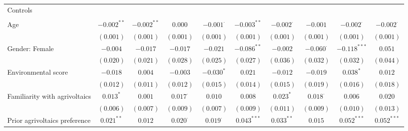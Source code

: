 \begin{center}
\begin{small}
\begin{longtable}{l@{} c@{} c@{} c@{} c@{} c@{} c@{} c@{} c@{} c@{}}
Controls                            &                  &                 &                 &                  &                  &                  &                  &                  &                  \\
                                    &                  &                 &                 &                  &                  &                  &                  &                  &                  \\
\quad Age                           & $-0.002^{**}$    & $-0.002^{**}$   & $0.000$         & $-0.001^{\cdot}$ & $-0.003^{**}$    & $-0.002^{\cdot}$ & $-0.001$         & $-0.002^{\cdot}$ & $-0.002^{\cdot}$ \\
                                    & $(0.001)$        & $(0.001)$       & $(0.001)$       & $(0.001)$        & $(0.001)$        & $(0.001)$        & $(0.001)$        & $(0.001)$        & $(0.001)$        \\
\quad Gender: Female                & $-0.004$         & $-0.017$        & $-0.017$        & $-0.021$         & $-0.086^{**}$    & $-0.002$         & $-0.060^{\cdot}$ & $-0.118^{***}$   & $0.051$          \\
                                    & $(0.020)$        & $(0.021)$       & $(0.028)$       & $(0.025)$        & $(0.027)$        & $(0.036)$        & $(0.032)$        & $(0.032)$        & $(0.044)$        \\
\quad Environmental score           & $-0.018$         & $0.004$         & $-0.003$        & $-0.030^{*}$     & $0.021$          & $-0.012$         & $-0.019$         & $0.038^{*}$      & $0.012$          \\
                                    & $(0.012)$        & $(0.011)$       & $(0.012)$       & $(0.015)$        & $(0.014)$        & $(0.015)$        & $(0.019)$        & $(0.016)$        & $(0.018)$        \\
\quad Familiarity with agrivoltaics & $0.013^{*}$      & $0.001$         & $0.017^{\cdot}$ & $0.010$          & $0.008$          & $0.023^{*}$      & $0.018^{\cdot}$  & $0.006$          & $0.020$          \\
                                    & $(0.006)$        & $(0.007)$       & $(0.009)$       & $(0.007)$        & $(0.009)$        & $(0.011)$        & $(0.009)$        & $(0.010)$        & $(0.013)$        \\
\quad Prior agrivoltaics preference & $0.021^{**}$     & $0.012$         & $0.020^{\cdot}$ & $0.019^{\cdot}$  & $0.043^{***}$    & $0.033^{**}$     & $0.015$          & $0.052^{***}$    & $0.052^{***}$    \\

\end{longtable}
\end{small}
\end{center}
